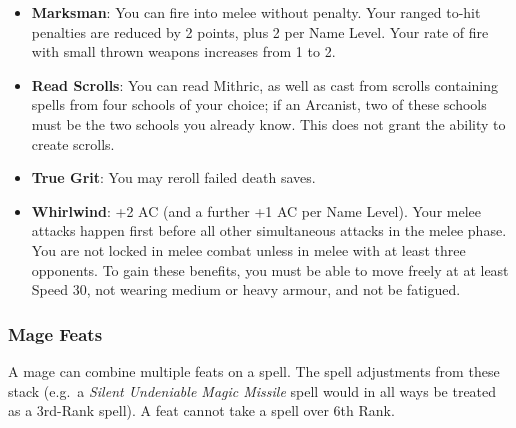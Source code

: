 \documentclass{book}
\begin{document}
\begin{itemize}
  weapon, your critical hit range improves by 1, plus 1 per Name Level
  (e.g.~you score critical hits on a natural to-hit roll of 19-20 at
  Level 1, 18-20 at Level 5, etc.).
\item
  \textbf{Marksman}: You can fire into melee without penalty. Your
  ranged to-hit penalties are reduced by 2 points, plus 2 per Name
  Level. Your rate of fire with small thrown weapons increases from 1 to
  2.
\item
  \textbf{Read Scrolls}: You can read Mithric, as well as cast from
  scrolls containing spells from four schools of your choice; if an
  Arcanist, two of these schools must be the two schools you already
  know. This does not grant the ability to create scrolls.
\item
  \textbf{True Grit}: You may reroll failed death saves.
\item
  \textbf{Whirlwind}: +2 AC (and a further +1 AC per Name Level). Your
  melee attacks happen first before all other simultaneous attacks in
  the melee phase. You are not locked in melee combat unless in melee
  with at least three opponents. To gain these benefits, you must be
  able to move freely at at least Speed 30, not wearing medium or heavy
  armour, and not be fatigued.
\end{itemize}

\subsubsection*{Mage Feats}\label{mage-feats}

A mage can combine multiple feats on a spell. The spell adjustments from
these stack (e.g.~a \emph{Silent Undeniable Magic Missile} spell would
in all ways be treated as a 3rd-Rank spell). A feat cannot take a spell
over 6th Rank.
\end{document}
